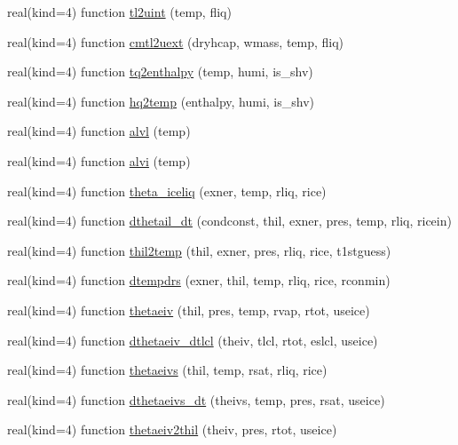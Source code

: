\begin{DoxyCompactItemize}
real(kind=4) function \hyperlink{namespacetherm__lib_a3ad59a4037ed8ed57532b8ea630a7df1}{tl2uint} (temp, fliq)
\item 
real(kind=4) function \hyperlink{namespacetherm__lib_a2db60e1f300fadcd09ef451059aa571b}{cmtl2uext} (dryhcap, wmass, temp, fliq)
\item 
real(kind=4) function \hyperlink{namespacetherm__lib_addd05382298a8487d09d7f6e2664dd62}{tq2enthalpy} (temp, humi, is\+\_\+shv)
\item 
real(kind=4) function \hyperlink{namespacetherm__lib_ad10129810640ad98a16dde22a0c244b8}{hq2temp} (enthalpy, humi, is\+\_\+shv)
\item 
real(kind=4) function \hyperlink{namespacetherm__lib_a543f4c6ab155d99ad9a5002a8143a654}{alvl} (temp)
\item 
real(kind=4) function \hyperlink{namespacetherm__lib_a4fbc9bf6cc7bc66ef4c68393149d7288}{alvi} (temp)
\item 
real(kind=4) function \hyperlink{namespacetherm__lib_a15a79fc7dd2aaabe7bc7da287e531324}{theta\+\_\+iceliq} (exner, temp, rliq, rice)
\item 
real(kind=4) function \hyperlink{namespacetherm__lib_a75e26a63ab4d3f6ea5f45315bf30f91b}{dthetail\+\_\+dt} (condconst, thil, exner, pres, temp, rliq, ricein)
\item 
real(kind=4) function \hyperlink{namespacetherm__lib_ac1f38c4afbbc3cf5a540d4e87c8b22c8}{thil2temp} (thil, exner, pres, rliq, rice, t1stguess)
\item 
real(kind=4) function \hyperlink{namespacetherm__lib_a98f9f548762461093dfbe7604fcc5601}{dtempdrs} (exner, thil, temp, rliq, rice, rconmin)
\item 
real(kind=4) function \hyperlink{namespacetherm__lib_a2523d158beee975faaed4552724aae65}{thetaeiv} (thil, pres, temp, rvap, rtot, useice)
\item 
real(kind=4) function \hyperlink{namespacetherm__lib_a46f478124e2b8b34a4f64e13df4a9713}{dthetaeiv\+\_\+dtlcl} (theiv, tlcl, rtot, eslcl, useice)
\item 
real(kind=4) function \hyperlink{namespacetherm__lib_a59bae4be9ba9f862c7b58953f37a9be2}{thetaeivs} (thil, temp, rsat, rliq, rice)
\item 
real(kind=4) function \hyperlink{namespacetherm__lib_a2c2d9dff6ab1ea0e1385b7f94e322c26}{dthetaeivs\+\_\+dt} (theivs, temp, pres, rsat, useice)
\item 
real(kind=4) function \hyperlink{namespacetherm__lib_a567e8e6a001cab2a0991a88f7b7fc28f}{thetaeiv2thil} (theiv, pres, rtot, useice)

\end{DoxyCompactItemize}
